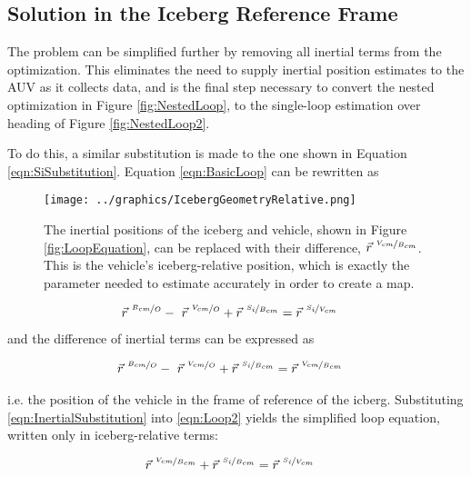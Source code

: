 \subsection{Solution in the Iceberg Reference Frame}
\label{sec.MainContrib}
The problem can be simplified further by removing all inertial terms from the optimization. This eliminates the need to supply inertial position estimates to the AUV as it collects data, and is the final step necessary to convert the nested optimization in Figure \ref{fig:NestedLoop}, to the single-loop estimation over heading of Figure \ref{fig:NestedLoop2}. 

To do this, a similar substitution is made to the one shown in Equation \ref{eqn:SiSubstitution}. Equation \ref{eqn:BasicLoop} can be rewritten as

\begin{figure}[htbp]
   \centering
   \texttt{[image: ../graphics/IcebergGeometryRelative.png]} %
   \caption{The inertial positions of the iceberg and vehicle, shown in Figure \ref{fig:LoopEquation}, can be replaced with their difference, $ \vec{r}^{~\nicefrac{V_{cm}}{B_{cm}}}$. This is the vehicle's iceberg-relative position, which is exactly the parameter needed to estimate accurately in order to create a map. }
    \label{fig:LoopEquationBergFrame}
\end{figure}

\begin{align}
\vec{r}^{~\nicefrac{B_{cm}}{O}}  - ~\vec{r}^{~\nicefrac{V_{cm}}{O}} + \vec{r}^{~\nicefrac{S_i}{B_{cm}}} &= \vec{r}^{~\nicefrac{S_i}{V_{cm}}}
\label{eqn:Loop2}
\end{align}
and the difference of inertial terms can be expressed as 

\begin{align}
\vec{r}^{~\nicefrac{B_{cm}}{O}}  - ~\vec{r}^{~\nicefrac{V_{cm}}{O}} + \vec{r}^{~\nicefrac{S_i}{B_{cm}}} &= \vec{r}^{~\nicefrac{V_{cm}}{B_{cm}}}
\label{eqn:InertialSubstitution}
\end{align}

i.e. the position of the vehicle in the frame of reference of the icberg. Substituting \ref{eqn:InertialSubstitution} into \ref{eqn:Loop2} yields the simplified loop equation, written only in iceberg-relative terms:

\begin{align}
\vec{r}^{~\nicefrac{V_{cm}}{B_{cm}}}+ \vec{r}^{~\nicefrac{S_i}{B_{cm}}} &= \vec{r}^{~\nicefrac{S_i}{V_{cm}}}
\label{eqn:IcebergLoop}
\end{align}

